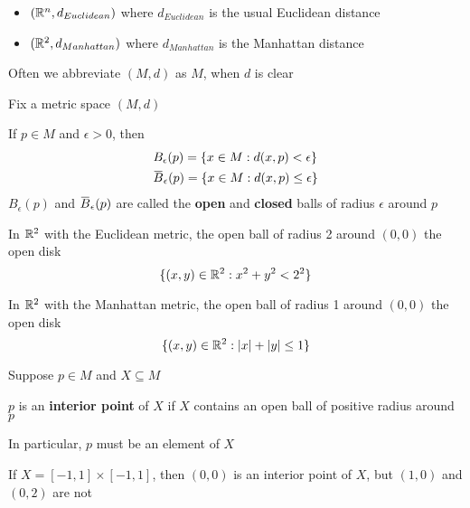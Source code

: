 \documentclass[11pt]{article}
\begin{document}
\begin{itemize}
\item \((\mathbb{R}^n,d_{Euclidean})\) where \(d_{Euclidean}\) is the usual Euclidean distance
\item \((\mathbb{R}^2,d_{Manhattan})\) where \(d_{Manhattan}\) is the Manhattan distance
\end{itemize}


Often we abbreviate \((M,d)\) as \(M\), when \(d\) is clear

Fix a metric space \((M,d)\)

\begin{definition}[]
If \(p\in M\) and \(\epsilon>0\), then
\begin{align*}
&B_\epsilon(p)=\{x\in M:d(x,p)<\epsilon\}\\
&\barB_\epsilon(p)=\{x\in M:d(x,p)\le\epsilon\}\\
\end{align*}
\(B_\epsilon(p)\) and \(\barB_\epsilon(p)\) are called the \textbf{open} and \textbf{closed} balls of radius \(\epsilon\) around \(p\)
\end{definition}

\begin{examplle}[]
In \(\mathbb{R}^2\) with the Euclidean metric, the open ball of radius 2 around \((0,0)\) the open disk
\begin{equation*}
\{(x,y)\in\mathbb{R}^2:x^2+y^2<2^2\}
\end{equation*}
\end{examplle}

\begin{examplle}[]
In \(\mathbb{R}^2\) with the Manhattan metric, the open ball of radius 1 around \((0,0)\) the open disk
\begin{equation*}
\{(x,y)\in\R^2:\abs{x}+\abs{y}\le 1\}
\end{equation*}
\end{examplle}

Suppose \(p\in M\) and \(X\subseteq M\)
\begin{definition}[]
\(p\) is an \textbf{interior point} of \(X\) if \(X\) contains an open ball of positive radius around \(p\)
\end{definition}

In particular, \(p\) must be an element of \(X\)


\begin{examplle}[]
If \(X=[-1,1]\times[-1,1]\), then \((0,0)\) is an interior point of \(X\), but \((1,0)\)
and \((0,2)\) are not
\end{examplle}
\end{document}
